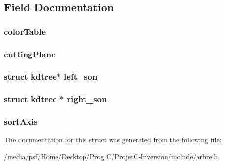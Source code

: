 \subsection{Field Documentation}
\hypertarget{structkdtree_a01650587a3ddd4599ba2bd7d73799b01}{
\subsubsection[{color\-Table}]{ color\-Table}}\label{structkdtree_a01650587a3ddd4599ba2bd7d73799b01}
\hypertarget{structkdtree_a8a891124909350e0112460ed18da147b}{
\subsubsection[{cutting\-Plane}]{ cutting\-Plane}}\label{structkdtree_a8a891124909350e0112460ed18da147b}
\hypertarget{structkdtree_aec9ab34520ea500f9e60f7a58df1d17e}{
\subsubsection[{left\-\_\-son}]{\setlength{\rightskip}{0pt plus 5cm}struct {\bf kdtree}$\ast$ left\-\_\-son}}\label{structkdtree_aec9ab34520ea500f9e60f7a58df1d17e}
\hypertarget{structkdtree_a192aa2e296f2f20a0709e98761dc61a7}{
\subsubsection[{right\-\_\-son}]{\setlength{\rightskip}{0pt plus 5cm}struct {\bf kdtree} $\ast$ right\-\_\-son}}\label{structkdtree_a192aa2e296f2f20a0709e98761dc61a7}
\hypertarget{structkdtree_a3d58acfe3498b2606c9cd620ce3f8e11}{
\subsubsection[{sort\-Axis}]{ sort\-Axis}}\label{structkdtree_a3d58acfe3498b2606c9cd620ce3f8e11}


The documentation for this struct was generated from the following file\-:\begin{DoxyCompactItemize}
\item 
/media/psf/\-Home/\-Desktop/\-Prog C/\-Projet\-C-\/\-Inversion/include/\hyperlink{arbre_8h}{arbre.\-h}\end{DoxyCompactItemize}
